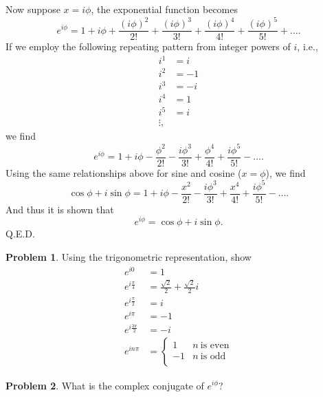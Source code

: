 \documentclass[final,a4paper,12pt]{article}
\theoremstyle{definition}
\newtheorem{problem}{Problem}[section]
\begin{document}
Now suppose $x = i \phi$, the exponential function becomes
\begin{equation*}
    e^{i\phi} = 1 + i\phi + \frac{(i\phi)^2}{2!} + \frac{(i\phi)^3}{3!}
        + \frac{(i\phi)^4}{4!} + \frac{(i\phi)^5}{5!} + \ldots .
\end{equation*}
If we employ the following repeating pattern from integer powers of $i$, i.e.,
\begin{align*}
    i^1 &= i \\ 
    i^2 &= -1 \\ 
    i^3 &= -i \\ 
    i^4 &= 1 \\ 
    i^5 &= i \\
    \vdots ,
\end{align*}
we find
\begin{equation*}
    e^{i\phi} = 1 + i\phi - \frac{\phi^2}{2!} - \frac{i \phi^3}{3!}
        + \frac{\phi^4}{4!} + \frac{i \phi^5}{5!} - \ldots .
\end{equation*}
Using the same relationships above for sine and cosine ($x = \phi$), we find
\begin{equation*}
    \cos \phi + i \sin \phi = 
        1 + i\phi - \frac{x^2}{2!} - \frac{i \phi^3}{3!} + \frac{x^4}{4!} 
        + \frac{i \phi^5}{5!} - \ldots .
\end{equation*}
And thus it is shown that
\begin{equation}
    e^{i \phi} = \cos \phi + i \sin \phi .
\end{equation}
Q.E.D.

\begin{problem}
Using the trigonometric representation, show
\begin{align*}
    e^{i0} & = 1 \\
    e^{i \frac{\pi}{4}} & = \frac{\sqrt{2}}{2} + \frac{\sqrt{2}}{2} i \\
    e^{i \frac{\pi}{2}} & = i \\
    e^{i \pi} & = -1 \\
    e^{i \frac{3\pi}{2}} & = -i \\
    e^{i n \pi} &=
    \begin{cases}
        1 & n\ \text{is even} \\
        -1 & n\ \text{is odd} \\
    \end{cases}
\end{align*}
\end{problem}

\begin{problem}
What is the complex conjugate of $e^{i \phi}$?
\end{problem}
\end{document}
